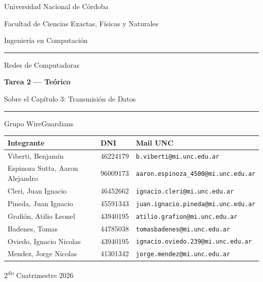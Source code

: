 \documentclass[11pt,a4paper]{article}
\begin{document}
\begin{titlepage}
    \thispagestyle{empty}
    \centering
    \vspace*{1cm}
    {\large Universidad Nacional de Córdoba\par}
    {\large Facultad de Ciencias Exactas, Físicas y Naturales\par}
    {\large Ingeniería en Computación\par}

    \vspace{1cm}
    \rule{\linewidth}{0.4pt}
    \vspace{1.5cm}

    {\Large Redes de Computadoras\par}
    \vspace{0.4cm}
    {\huge\bfseries Tarea 2 --- Teórico\par}
    \vspace{0.4cm}
    {\large Sobre el Capítulo 3: Transmisión de Datos\par}

    \vspace{1.5cm}
    \rule{\linewidth}{0.4pt}
    \vspace{2cm}

    {\Large Grupo WireGuardians\par}
    \vspace{1cm}

    \begin{tabular}{lll}
        \toprule
        \textbf{Integrante} & \textbf{DNI} & \textbf{Mail UNC} \\
        \midrule
        Viberti, Benjamin & 46224179 & \texttt{b.viberti@mi.unc.edu.ar} \\
        Espinoza Sutta, Aaron Alejandro & 96009173 & \texttt{aaron.espinoza\_4500@mi.unc.edu.ar} \\
        Cleri, Juan Ignacio & 46452662 & \texttt{ignacio.cleri@mi.unc.edu.ar} \\
        Pineda, Juan Ignacio & 45591343 & \texttt{juan.ignacio.pineda@mi.unc.edu.ar} \\
        Grafión, Atilio Leonel & 43940195 & \texttt{atilio.grafion@mi.unc.edu.ar} \\
        Badenes, Tomas & 44785038 & \texttt{tomasbadenes@mi.unc.edu.ar} \\
        Oviedo, Ignacio Nicolas & 43940195 & \texttt{ignacio.oviedo.239@mi.unc.edu.ar} \\
        Mendez, Jorge Nicolas & 41301342 & \texttt{jorge.mendez@mi.unc.edu.ar} \\
        \bottomrule
    \end{tabular}

    \vfill
    {\large 2\textsuperscript{do} Cuatrimestre 2026\par}
\end{titlepage}
\end{document}
